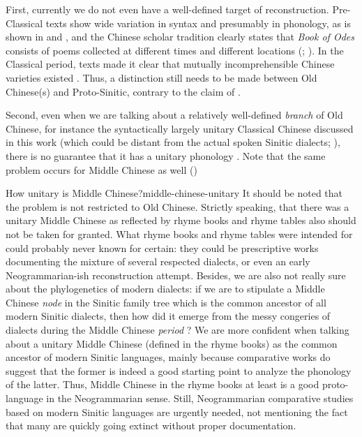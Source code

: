 \documentclass[UTF8, a4paper, oneside, scheme=plain, 12pt]{ctexrep}
\newcommand*{\citepage}[1]{p.~{#1}}
\newcommand*{\citepages}[1]{pp.~{#1}}
\newcommand{\work}[1]{\textit{#1}}
\begin{document}
First, currently we do not even have a well-defined target of reconstruction.
Pre-Classical texts show wide variation in syntax and presumably in phonology,
as is shown in  and ,
and the Chinese scholar tradition clearly states that 
\work{Book of Odes} consists of poems collected at different times and different locations 
(; \citealt[\citepages{478-480}]{harbsmeier2016irrefutable}).
In the Classical period, texts made it clear that mutually incomprehensible Chinese varieties existed \citep[\citepages{446-447}]{harbsmeier2016irrefutable}.
Thus, a distinction still needs to be made between Old Chinese(s) and Proto-Sinitic,
contrary to the claim of \citet[\citepage{2}]{baxter2014old}.

Second, even when we are talking about a relatively well-defined \emph{branch} of Old Chinese,
for instance the syntactically largely unitary Classical Chinese discussed in this work
(which could be distant from the actual spoken Sinitic dialects; ),
there is no guarantee that it has a unitary phonology
\citep[\citepages{488-490}]{harbsmeier2016irrefutable}.
Note that the same problem occurs for Middle Chinese as well ()

\begin{infobox}{How unitary is Middle Chinese?}{middle-chinese-unitary}
    It should be noted that the problem is not restricted to Old Chinese.
    Strictly speaking, that there was a unitary Middle Chinese
    as reflected by rhyme books and rhyme tables also should not be taken for granted.
    What rhyme books and rhyme tables were intended for could probably never known for certain:
    they could be prescriptive works documenting the mixture of several respected dialects,
    or even an early Neogrammarian-ish reconstruction attempt.
    Besides, we are also not really sure about the phylogenetics of modern dialects:
    if we are to stipulate a Middle Chinese \emph{node} in the Sinitic family tree
    which is the common ancestor of all modern Sinitic dialects,
    then how did it emerge from the messy congeries of dialects during the Middle Chinese \emph{period} \citep[\citepages{477-478}]{harbsmeier2016irrefutable}?
    We are more confident when talking about a unitary Middle Chinese (defined in the rhyme books)
    as the common ancestor of modern Sinitic languages,
    mainly because comparative works do suggest that the former is indeed a good starting point to analyze the phonology of the latter.
    Thus, Middle Chinese in the rhyme books at least is a good proto-language in the Neogrammarian sense.
    Still, Neogrammarian comparative studies based on modern Sinitic languages are urgently needed,
    not mentioning the fact that many are quickly going extinct without proper documentation.
\end{infobox}
\end{document}
